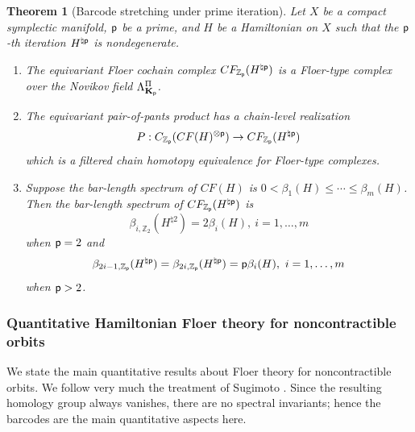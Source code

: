 \documentclass[reqno, 10pt]{amsart}
\numberwithin{equation}{section}
\numberwithin{equation}{section}
\newtheorem{thma}{Theorem}
\theoremstyle{definition}
\theoremstyle{remark}
\newcommand{\beqn}{\begin{equation*}}
\newcommand{\eeqn}{\end{equation*}}
\newcommand{\mb}{\mathbb}
\newcommand{\p}{{\sf p}}
\newcommand{\kp}{{\bf K}_{\sf p}}
\newcommand{\zp}{{{\mb Z}_{\sf p}}}
\begin{document}
\begin{thma}[Barcode stretching under prime iteration]\label{thm_pants_filtered}
Let $X$ be a compact symplectic manifold, $\p$ be a prime, and $H$ be a Hamiltonian on $X$ such that the $\p$-th iteration $H^{\natural \p}$ is nondegenerate.

\begin{enumerate}

\item The equivariant Floer cochain complex $CF_{\zp} (H^{\natural \p})$ is a Floer-type complex over the Novikov field $\Lambda_{\kp}^\Pi$. 

\item The equivariant pair-of-pants product has a chain-level realization
\beqn
P: C_{\zp}(CF(H)^{\otimes \p}) \to CF_{\zp}(H^{\natural \p})
\eeqn
which is a filtered chain homotopy equivalence for Floer-type complexes.

\item Suppose the bar-length spectrum of $CF(H)$ is $0 < \beta_1(H) \leq \cdots \leq \beta_m(H)$. Then the bar-length spectrum of $CF_{\zp}(H^{\natural \p})$ is 
\beqn
\beta_{i, {\mb Z}_2}(H^{\natural 2}) = 2 \beta_i(H),\ i = 1, \ldots, m
\eeqn
when $\p = 2$ and 
\beqn
\beta_{2i-1, \zp}(H^{\natural \p}) = \beta_{2i, \zp}(H^{\natural \p}) = \p \beta_i(H),\ i = 1, \ldots, m
\eeqn
when $\p > 2$.
\end{enumerate}
\end{thma}
 



\subsubsection{Quantitative Hamiltonian Floer theory for noncontractible orbits}

We state the main quantitative results about Floer theory for noncontractible orbits. We follow very much the treatment of Sugimoto \cite{Sugimoto_2026}. Since the resulting homology group always vanishes, there are no spectral invariants; hence the barcodes are the main quantitative aspects here. 
\end{document}
